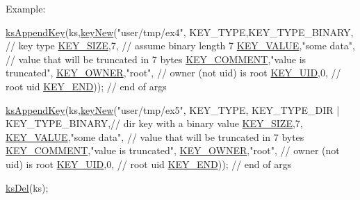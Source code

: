 \begin{DoxyParagraph}{Example\-:}
\begin{DoxyCode}
\hyperlink{group__keyset_gaa5a1d467a4d71041edce68ea7748ce45}{ksAppendKey}(ks,\hyperlink{group__key_gaf6893c038b3ebee90c73a9ea8356bebf}{keyNew}(\textcolor{stringliteral}{"user/tmp/ex4"},
        KEY\_TYPE,KEY\_TYPE\_BINARY,       \textcolor{comment}{// key type}
        \hyperlink{group__key_gga91fb3178848bd682000958089abbaf40a6d531b5c41445d19d0452eebdccbfa01}{KEY\_SIZE},7,                     \textcolor{comment}{// assume binary length 7}
        \hyperlink{group__key_gga91fb3178848bd682000958089abbaf40ac66e4a49d09212b79f5754ca6db5bd2e}{KEY\_VALUE},\textcolor{stringliteral}{"some data"},          \textcolor{comment}{// value that will be
       truncated in 7 bytes}
        \hyperlink{group__key_gga91fb3178848bd682000958089abbaf40ac29427bb47cc31689d02912e36161ee3}{KEY\_COMMENT},\textcolor{stringliteral}{"value is truncated"},
        \hyperlink{group__key_gga91fb3178848bd682000958089abbaf40a77ca60362fa8daca8d5347db4385068b}{KEY\_OWNER},\textcolor{stringliteral}{"root"},               \textcolor{comment}{// owner (not uid) is root}
        \hyperlink{group__key_gga91fb3178848bd682000958089abbaf40a28f01a87d65f065172f734c9c9446c0e}{KEY\_UID},0,                      \textcolor{comment}{// root uid}
        \hyperlink{group__key_gga91fb3178848bd682000958089abbaf40aa8adb6fcb92dec58fb19410eacfdd403}{KEY\_END}));                      \textcolor{comment}{// end of args}

\hyperlink{group__keyset_gaa5a1d467a4d71041edce68ea7748ce45}{ksAppendKey}(ks,\hyperlink{group__key_gaf6893c038b3ebee90c73a9ea8356bebf}{keyNew}(\textcolor{stringliteral}{"user/tmp/ex5"},
        KEY\_TYPE,
                KEY\_TYPE\_DIR | KEY\_TYPE\_BINARY,\textcolor{comment}{// dir key with a binary value}
        \hyperlink{group__key_gga91fb3178848bd682000958089abbaf40a6d531b5c41445d19d0452eebdccbfa01}{KEY\_SIZE},7,
        \hyperlink{group__key_gga91fb3178848bd682000958089abbaf40ac66e4a49d09212b79f5754ca6db5bd2e}{KEY\_VALUE},\textcolor{stringliteral}{"some data"},          \textcolor{comment}{// value that will be
       truncated in 7 bytes}
        \hyperlink{group__key_gga91fb3178848bd682000958089abbaf40ac29427bb47cc31689d02912e36161ee3}{KEY\_COMMENT},\textcolor{stringliteral}{"value is truncated"},
        \hyperlink{group__key_gga91fb3178848bd682000958089abbaf40a77ca60362fa8daca8d5347db4385068b}{KEY\_OWNER},\textcolor{stringliteral}{"root"},               \textcolor{comment}{// owner (not uid) is root}
        \hyperlink{group__key_gga91fb3178848bd682000958089abbaf40a28f01a87d65f065172f734c9c9446c0e}{KEY\_UID},0,                      \textcolor{comment}{// root uid}
        \hyperlink{group__key_gga91fb3178848bd682000958089abbaf40aa8adb6fcb92dec58fb19410eacfdd403}{KEY\_END}));                      \textcolor{comment}{// end of args}

\hyperlink{group__keyset_ga27e5c16473b02a422238c8d970db7ac8}{ksDel}(ks);
\end{DoxyCode}

\end{DoxyParagraph}
